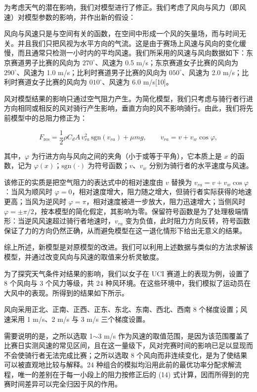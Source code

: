 \documentclass[11pt,a4paper]{ctexart}
\begin{document}
为考虑天气的潜在影响，我们对模型进行了修正。我们考虑了风向与风力（即风速）对模型参数的影响，并作出新的假设：

风向与风速只是与空间有关的函数，在空间中形成一个风的矢量场，而与时间无关。并且我们只把风视为水平方向的气流。这是由于赛场上风速与风向的变化缓慢，而且通常只检测一小时内的平均风速。我们所采用的风速与风向数据如下：东京赛道男子比赛的风向为 $270^\circ$、风速为 0.5 m/s；东京赛道女子比赛的风向为 $290^\circ$、风速为 1.0 m/s；比利时赛道男子比赛的风向为 $050^\circ$、风速为 2.0 m/s；比利时赛道女子比赛的风向为 $010^\circ$、风速为 6.0 m/s[10]。

风对模型结果的影响只通过空气阻力产生。为简化模型，我们只考虑与骑行者行进方向相同或相反的风对骑行产生影响，垂直方向的风不影响骑行。由此，我们将先前模型中的总阻力修正为：

\begin{equation}
F_{\mathrm{res}} = \frac{1}{2}\rho C_d A\, v_{ra}^2 \, \mathrm{sgn}\left(v_{ra}\right) + \mu m g, \qquad v_{ra} = v + v_w \cos\varphi ,
\end{equation}

其中，$\varphi$ 为行进方向与风向之间的夹角（小于或等于平角），它本质上是 $x$ 的函数，记为 $\varphi(x)$；$\mathrm{sgn}(\cdot)$ 为符号函数；$v$、$v_w$ 分别为骑行者的水平速度与风速。

该修正的实质是把空气阻力的表达式中的相对速度由 $v$ 替换为 $v_{ra} = v + v_w\cos\varphi$：当风为顺风时 $\varphi = 0$，相对速度增大，阻力随之增大，但骑行者实际获得的地速更高；当风为逆风时 $\varphi = \pi$，相对速度被进一步放大，阻力迅速增大；当侧风时 $\varphi = \pm\pi/2$，按本模型的简化假定，其影响为零。保留符号函数是为了处理极端情形：当逆风风速超过骑行者地速时，$v_{ra}$ 变为负值，此时阻力方向反转，符号函数保证了力的方向仍然正确，从而避免模型在这一退化情形下给出无意义的结果。

综上所述，新模型是对原模型的改进。我们可以利用上述数据与类似的方法求解该模型，并通过改变风向与风速的取值来分析灵敏度。

为了探究天气条件对结果的影响，我们以女子在 UCI 赛道上的表现为例，设置了 8 个风向与 3 个风力等级，共 24 种风环境。在这些环境中，我们模拟了运动员在大风中的表现。所得到的结果如下所示。

风向采用正北、正南、正西、正东、东北、东南、西北、西南 8 个梯度设置；风速采用 1 m/s、2 m/s 与 3 m/s 三个梯度设置。

需要说明的是，之所以选取 1$\sim$3 m/s 作为风速的取值范围，是因为该范围覆盖了比赛日实测风速的常见区间，且在这一量级下，风对完赛时间的影响已足以显现而不会使骑行者无法完成比赛；之所以选取 8 个风向而非连续变化，是为了使结果可以被直观地比较与解释。24 种组合的模拟均沿用此前的最优功率分配求解流程，唯一的差别在于每一小段上的阻力按修正后的 (14) 式计算，因而所得到的完赛时间差异可以完全归因于风的作用。
\end{document}
